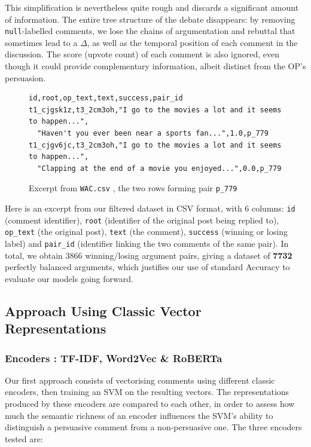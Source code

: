 \documentclass[11pt,a4paper]{article}
\begin{document}
This simplification is nevertheless quite rough and discards a significant
amount of information. The entire tree structure of the debate disappears:
by removing \texttt{null}-labelled comments, we lose the chains of
argumentation and rebuttal that sometimes lead to a $\Delta$, as well as the
temporal position of each comment in the discussion. The score (upvote count)
of each comment is also ignored, even though it could provide complementary
information, albeit distinct from the OP's persuasion.

\vspace{0.3cm}

\begin{figure}[H]
\begin{lstlisting}[basicstyle=\ttfamily\scriptsize, breaklines=true, frame=single]
id,root,op_text,text,success,pair_id
t1_cjgsk1z,t3_2cm3oh,"I go to the movies a lot and it seems to happen...",
  "Haven't you ever been near a sports fan...",1.0,p_779
t1_cjgv6jc,t3_2cm3oh,"I go to the movies a lot and it seems to happen...",
  "Clapping at the end of a movie you enjoyed...",0.0,p_779
\end{lstlisting}
\caption{Excerpt from \texttt{WAC.csv} , the two rows forming pair \texttt{p\_779}}
\label{fig:wac-simplifie}
\end{figure}

Here is an excerpt from our filtered dataset in CSV format, with 6 columns:
\texttt{id} (comment identifier), \texttt{root} (identifier of the original
post being replied to), \texttt{op\_text} (the original post), \texttt{text}
(the comment), \texttt{success} (winning or losing label) and \texttt{pair\_id}
(identifier linking the two comments of the same pair). In total, we obtain
3866 winning/losing argument pairs, giving a dataset of \textbf{7732} perfectly
balanced arguments, which justifies our use of standard Accuracy to evaluate
our models going forward.


\subsection{Approach Using Classic Vector Representations}
\subsubsection{Encoders : TF-IDF, Word2Vec \& RoBERTa}

Our first approach consists of vectorising comments using different classic
encoders, then training an SVM on the resulting vectors. The representations
produced by these encoders are compared to each other, in order to assess
how much the semantic richness of an encoder influences the SVM's ability to
distinguish a persuasive comment from a non-persuasive one. The three
encoders tested are:
\end{document}
